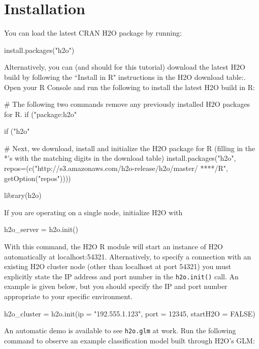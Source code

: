 \documentclass[11pt]{article}
\begin{document}
\section{Installation} 

You can load the latest CRAN H2O package by running:

\begin{spverbatim}
install.packages("h2o")
\end{spverbatim}
\bigskip
\noindent
Alternatively, you can (and should for this tutorial) download the latest H2O build by following the ``Install in R" instructions in the H2O download table:. Open your R Console and run the following to install the latest H2O build in R:

\begin{spverbatim}
# The following two commands remove any previously installed H2O packages for R.
if ("package:h2o" %

if ("h2o" %

# Next, we download, install and initialize the H2O package for R (filling in the *'s with the matching digits in the download table)
install.packages("h2o", repos=(c("http://s3.amazonaws.com/h2o-release/h2o/master/
****/R", getOption("repos"))))

library(h2o)

\end{spverbatim}
\noindent
If you are operating on a single node, initialize H2O with

\begin{spverbatim}
h2o_server = h2o.init()

\end{spverbatim}
\noindent
With this command, the H2O R module will start an instance of H2O automatically at localhost:54321. Alternatively,  to specify a connection with an existing H2O cluster node (other than localhost at port 54321) you must explicitly state the IP address and port number in the \texttt{h2o.init()} call. An example is given below, but you should specify the IP and port number appropriate to your specific environment.

\begin{spverbatim}
h2o_cluster = h2o.init(ip = "192.555.1.123", port = 12345, startH2O = FALSE)

\end{spverbatim}
\noindent
An automatic demo is available to see \texttt{h2o.glm} at work. Run the following command to observe an example classification model built through H2O's GLM:
\end{document}
